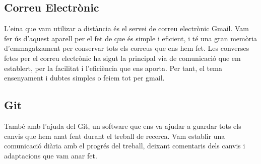 \subsection{Correu Electrònic}
L'eina que vam utilizar a distància és el servei de correu electrònic Gmail. Vam fer ús d'aquest aparell per el fet de que és simple i eficient, i té una gran memòria d'emmagatzament per conservar tots els correus que ens hem fet.
Les converses fetes per el correu electrònic ha sigut la principal via de comunicació que em establert, per la facilitat i l'eficiència que ens aporta. Per tant, el tema ensenyament i dubtes simples o feiem tot per gmail.

\subsection{Git}
També amb l'ajuda del Git, un software que ens va ajudar a guardar tots els canvis que hem anat fent durant el treball de recerca. Vam  establir una comunicació diària amb el progrés del treball, deixant comentaris dels canvis i adaptacions que vam anar fet.

